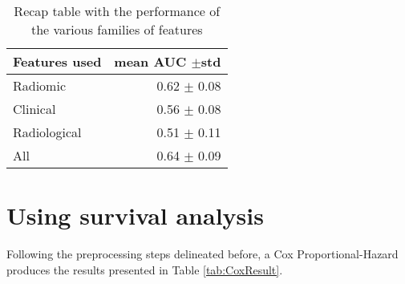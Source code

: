 \begin{table}
\caption{Recap table with the performance of the various families of features \label{tab:RecapicuRF}}
\centering
\begin{tabular}{l|r}
\toprule
Features used & mean AUC $\pm$std\\
\midrule
Radiomic  & 0.62 $\pm$ 0.08\\
Clinical  &  0.56 $\pm$ 0.08\\
Radiological & 0.51 $\pm$ 0.11\\
All & 0.64 $\pm$ 0.09\\
\bottomrule
\end{tabular}
\end{table}

\section{Using survival analysis}
Following the preprocessing steps delineated before,  a Cox Proportional-Hazard produces the results presented in Table \ref{tab:CoxResult}.
%
